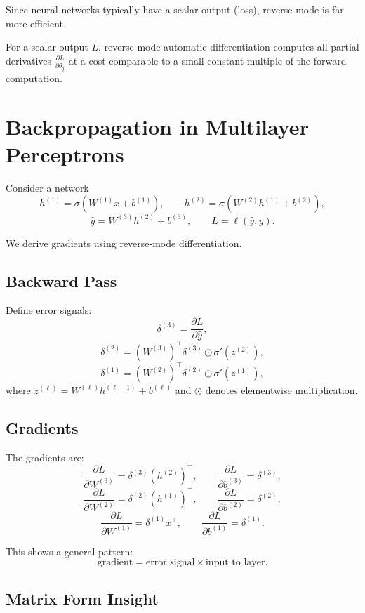 Since neural networks typically have a scalar output (loss), reverse mode is far more efficient.

\begin{proposition}
For a scalar output $L$, reverse-mode automatic differentiation computes all partial derivatives $\frac{\partial L}{\partial \theta_j}$ at a cost comparable to a small constant multiple of the forward computation.
\end{proposition}

\section{Backpropagation in Multilayer Perceptrons}

Consider a network
\[
h^{(1)} = \sigma(W^{(1)}x + b^{(1)}),\qquad
h^{(2)} = \sigma(W^{(2)}h^{(1)} + b^{(2)}),
\]
\[
\hat{y} = W^{(3)}h^{(2)} + b^{(3)},\qquad
L = \ell(\hat{y}, y).
\]

We derive gradients using reverse-mode differentiation.

\subsection{Backward Pass}

Define error signals:
\[
\delta^{(3)} = \frac{\partial L}{\partial \hat{y}},
\]
\[
\delta^{(2)} = (W^{(3)})^\top \delta^{(3)} \odot \sigma'(z^{(2)}),
\]
\[
\delta^{(1)} = (W^{(2)})^\top \delta^{(2)} \odot \sigma'(z^{(1)}),
\]
where $z^{(\ell)} = W^{(\ell)}h^{(\ell-1)} + b^{(\ell)}$ and $\odot$ denotes elementwise multiplication.

\subsection{Gradients}

The gradients are:
\[
\frac{\partial L}{\partial W^{(3)}} = \delta^{(3)} (h^{(2)})^\top,\qquad
\frac{\partial L}{\partial b^{(3)}} = \delta^{(3)},
\]
\[
\frac{\partial L}{\partial W^{(2)}} = \delta^{(2)} (h^{(1)})^\top,\qquad
\frac{\partial L}{\partial b^{(2)}} = \delta^{(2)},
\]
\[
\frac{\partial L}{\partial W^{(1)}} = \delta^{(1)} x^\top,\qquad
\frac{\partial L}{\partial b^{(1)}} = \delta^{(1)}.
\]

This shows a general pattern:
\[
\text{gradient} = \text{error signal} \times \text{input to layer}.
\]

\subsection{Matrix Form Insight}

